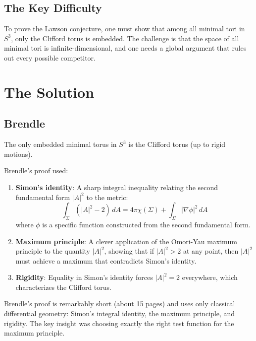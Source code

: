 \subsection{The Key Difficulty}
To prove the Lawson conjecture, one must show that among all minimal tori in $S^3$, only the Clifford torus is embedded. The challenge is that the space of all minimal tori is infinite-dimensional, and one needs a global argument that rules out every possible competitor.

\section{The Solution}

\subsection{Brendle \cite{brendle2013}}

\begin{theorem}
The only embedded minimal torus in $S^3$ is the Clifford torus (up to rigid motions).
\end{theorem}

Brendle's proof used:
\begin{enumerate}
\item \textbf{Simon's identity}: A sharp integral inequality relating the second fundamental form $|A|^2$ to the metric:
\[
\int_\Sigma \left( |A|^2 - 2 \right) \, dA = 4\pi \chi(\Sigma) + \int_\Sigma |\nabla \phi|^2 \, dA
\]
where $\phi$ is a specific function constructed from the second fundamental form.

\item \textbf{Maximum principle}: A clever application of the Omori-Yau maximum principle to the quantity $|A|^2$, showing that if $|A|^2 > 2$ at any point, then $|A|^2$ must achieve a maximum that contradicts Simon's identity.

\item \textbf{Rigidity}: Equality in Simon's identity forces $|A|^2 = 2$ everywhere, which characterizes the Clifford torus.
\end{enumerate}

\begin{highlightbox}
Brendle's proof is remarkably short (about 15 pages) and uses only classical differential geometry: Simon's integral identity, the maximum principle, and rigidity. The key insight was choosing exactly the right test function for the maximum principle.
\end{highlightbox}

